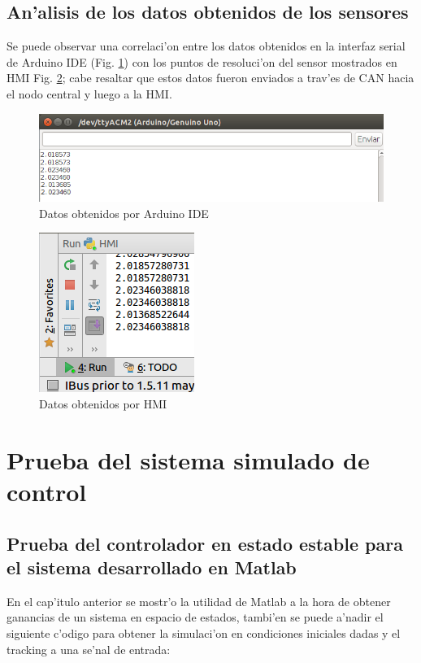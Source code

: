 \subsection{An'alisis de los datos obtenidos de los sensores}
Se puede observar una correlaci'on entre los datos obtenidos en la interfaz serial de Arduino IDE (Fig. \ref{fig:dard}) con los puntos de resoluci'on del sensor mostrados en HMI Fig. \ref{fig:dHMI}; cabe resaltar que estos datos fueron enviados a trav'es de CAN hacia el nodo central y luego a la HMI.
\begin{figure}[ht]
	\centering
		\includegraphics[scale=0.9]{datoshmi}
	\caption{Datos obtenidos por Arduino IDE}
	\label{fig:dard}
\end{figure}
\begin{figure}[ht]
	\centering
		\includegraphics[scale=1]{datoshmi2}
	\caption{Datos obtenidos por HMI}
	\label{fig:dHMI}
\end{figure}

\section{Prueba del sistema simulado de control}

\subsection{Prueba del controlador en estado estable para el sistema desarrollado en Matlab}
\setlength{\parskip}{0.4cm}
En el cap'itulo anterior se mostr'o la utilidad de Matlab a la hora de obtener ganancias de un sistema en espacio de estados, tambi'en se puede a'nadir el siguiente c'odigo para obtener la simulaci'on en condiciones iniciales dadas y el tracking a una se'nal de entrada:

